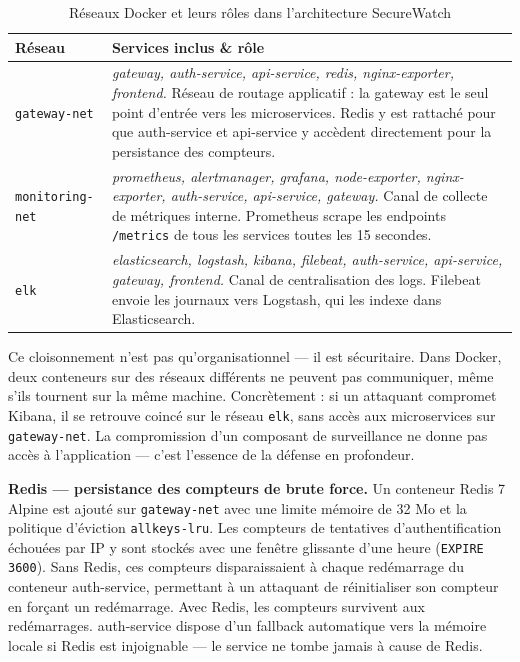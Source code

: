 \documentclass[12pt, a4paper]{report}
\begin{document}
\begin{table}[H]
  \centering
  \caption{Réseaux Docker et leurs rôles dans l'architecture SecureWatch}
  \begin{tabularx}{\textwidth}{@{}lX@{}}
    \toprule
    \textbf{Réseau} & \textbf{Services inclus \& rôle} \\
    \midrule
    \texttt{gateway-net}
      & \textit{gateway, auth-service, api-service, redis, nginx-exporter, frontend.}
        Réseau de routage applicatif : la gateway est le seul point d'entrée vers les microservices. Redis y est rattaché pour que auth-service et api-service y accèdent directement pour la persistance des compteurs. \\
    \addlinespace
    \texttt{monitoring-net}
      & \textit{prometheus, alertmanager, grafana, node-exporter, nginx-exporter, auth-service, api-service, gateway.}
        Canal de collecte de métriques interne. Prometheus scrape les endpoints \texttt{/metrics} de tous les services toutes les 15 secondes. \\
    \addlinespace
    \texttt{elk}
      & \textit{elasticsearch, logstash, kibana, filebeat, auth-service, api-service, gateway, frontend.}
        Canal de centralisation des logs. Filebeat envoie les journaux vers Logstash, qui les indexe dans Elasticsearch. \\
    \bottomrule
  \end{tabularx}
\end{table}

\medskip
Ce cloisonnement n'est pas qu'organisationnel — il est sécuritaire. Dans Docker, deux conteneurs sur des réseaux différents ne peuvent pas communiquer, même s'ils tournent sur la même machine. Concrètement : si un attaquant compromet Kibana, il se retrouve coincé sur le réseau \texttt{elk}, sans accès aux microservices sur \texttt{gateway-net}. La compromission d'un composant de surveillance ne donne pas accès à l'application — c'est l'essence de la défense en profondeur.

\textbf{Redis — persistance des compteurs de brute force.} Un conteneur Redis 7 Alpine est ajouté sur \texttt{gateway-net} avec une limite mémoire de 32 Mo et la politique d'éviction \texttt{allkeys-lru}. Les compteurs de tentatives d'authentification échouées par IP y sont stockés avec une fenêtre glissante d'une heure (\texttt{EXPIRE 3600}). Sans Redis, ces compteurs disparaissaient à chaque redémarrage du conteneur auth-service, permettant à un attaquant de réinitialiser son compteur en forçant un redémarrage. Avec Redis, les compteurs survivent aux redémarrages. auth-service dispose d'un fallback automatique vers la mémoire locale si Redis est injoignable — le service ne tombe jamais à cause de Redis.
\end{document}
